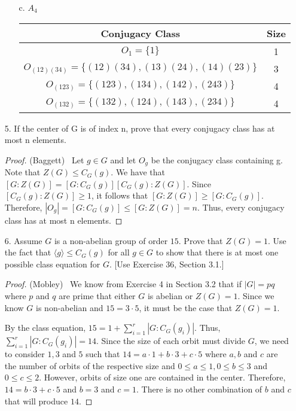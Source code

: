 \documentclass[10pt]{article}
\begin{document}
\begin{itemize}
\begin{itemize}
\item[c.] $A_4$
\begin{center}
\begin{tabular}{cc}
Conjugacy Class & Size\\
\hline
$O_1 = \{1\}$ & 1\\
$O_{(12)(34)} = \{(12)(34),(13)(24),(14)(23)\}$ & 3\\
$O_{(123)} = \{(123),(134),(142),(243)\}$ & 4\\
$O_{(132)} = \{(132),(124),(143),(234)\}$ & 4\\

\end{tabular}
\end{center}

\end{itemize}

\item[5.] If the center of G is of index n, prove that every conjugacy class has at most n elements.

\begin{proof}(Baggett) \ Let $g \in G$ and let $O_g$ be the conjugacy class containing g. Note that $Z(G) \leq C_G(g)$.
We have that $[G:Z(G)] = [G:C_G(g)][C_G(g):Z(G)]$. Since
$[C_G(g):Z(G)] \geq 1$, it follows that $[G:Z(G)] \geq [G:C_G(g)]$.
Therefore, $|O_g| = [G:C_G(g)] \leq [G:Z(G)] = n$. Thus, every
conjugacy class has at most n elements.
\end{proof}

\item[6.]  Assume $G$ is a non-abelian group of order $15$.  Prove that $Z(G)=1$.  Use the fact that $\langle  g \rangle \leq C_{G}(g)$ for
all $g \in G$ to show that there is at most one possible class
equation for $G$.  [Use Exercise 36, Section 3.1.]

\begin{proof}(Mobley) \  We know from Exercise 4 in Section 3.2 that if $|G|=pq$ where $p$ and $q$ are prime that either $G$ is abelian or
$Z(G)=1$.  Since we know $G$ is non-abelian and $15=3\cdot 5$, it
must be the case that $Z(G)=1$.

By the class equation, $15=1+\displaystyle
\sum_{i=1}^{r}|G:C_{G}(g_i)|$.  Thus, $\displaystyle
\sum_{i=1}^{r}|G:C_{G}(g_i)|=14$.  Since the size of each orbit must
divide $G$, we need to consider $1, 3$ and $5$ such that $14=a\cdot
1 + b\cdot 3+ c\cdot 5$ where $a, b$ and $c$ are the number of
orbits of the respective size and $0\leq a\leq 1, 0\leq b \leq 3$
and $0\leq c \leq 2$.  However, orbits of size one are contained in
the center. Therefore, $14=b\cdot 3+ c\cdot 5$ and $b=3$ and $c=1$.
There is no other combination of $b$ and $c$ that will produce $14$.


\end{proof}
\end{itemize}
\end{document}
